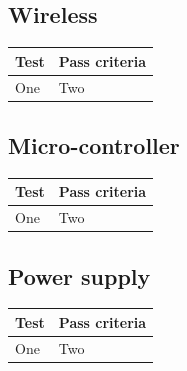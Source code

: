 \documentclass[12pt]{article}
\begin{document}
\subsection{Wireless}
\begin{center}
  \begin{table}[!htb]
    
    \hskip-2.2cm\begin{tabular}{|p{8cm}|p{10cm}|}
        \hline
        \textbf{Test} & \textbf{Pass criteria} \\
        \hline

        One & Two \\

        \hline

      \end{tabular}    
      
      \label{tab:summary_measurments}
     \end{table}
  \end{center}

\subsection{Micro-controller}
\begin{center}
  \begin{table}[!htb]
    
    \hskip-2.2cm\begin{tabular}{|p{8cm}|p{10cm}|}
        \hline
        \textbf{Test} & \textbf{Pass criteria} \\
        \hline

        One & Two \\

        \hline

      \end{tabular}    
      
      \label{tab:summary_measurments}
     \end{table}
  \end{center}

\subsection{Power supply}
\begin{center}
  \begin{table}[!htb]
    
    \hskip-2.2cm\begin{tabular}{|p{8cm}|p{10cm}|}
        \hline
        \textbf{Test} & \textbf{Pass criteria} \\
        \hline

        One & Two \\

        \hline

      \end{tabular}    
      
      \label{tab:summary_measurments}
     \end{table}
  \end{center}
\end{document}
